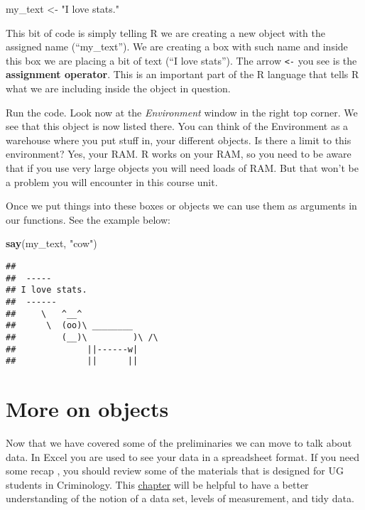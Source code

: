 \documentclass[
]{book}
\newenvironment{Shaded}{\begin{snugshade}}{\end{snugshade}}
\newcommand{\FunctionTok}[1]{\textcolor[rgb]{0.13,0.29,0.53}{\textbf{#1}}}
\newcommand{\NormalTok}[1]{#1}
\newcommand{\OtherTok}[1]{\textcolor[rgb]{0.56,0.35,0.01}{#1}}
\newcommand{\StringTok}[1]{\textcolor[rgb]{0.31,0.60,0.02}{#1}}
\begin{document}
\begin{Shaded}
\begin{Highlighting}[]
\NormalTok{my\_text }\OtherTok{\textless{}{-}} \StringTok{"I love stats."}
\end{Highlighting}
\end{Shaded}

This bit of code is simply telling R we are creating a new object with the assigned name (``my\_text''). We are creating a box with such name and inside this box we are placing a bit of text (``I love stats''). The arrow \texttt{\textless{}-} you see is the \textbf{assignment operator}. This is an important part of the R language that tells R what we are including inside the object in question.

Run the code. Look now at the \emph{Environment} window in the right top corner. We see that this object is now listed there. You can think of the Environment as a warehouse where you put stuff in, your different objects. Is there a limit to this environment? Yes, your RAM. R works on your RAM, so you need to be aware that if you use very large objects you will need loads of RAM. But that won't be a problem you will encounter in this course unit.

Once we put things into these boxes or objects we can use them as arguments in our functions. See the example below:

\begin{Shaded}
\begin{Highlighting}[]
\FunctionTok{say}\NormalTok{(my\_text, }\StringTok{"cow"}\NormalTok{)}
\end{Highlighting}
\end{Shaded}

\begin{verbatim}
## 
##  ----- 
## I love stats. 
##  ------ 
##     \   ^__^ 
##      \  (oo)\ ________ 
##         (__)\         )\ /\ 
##              ||------w|
##              ||      ||
\end{verbatim}

\section{More on objects}\label{more-on-objects}

Now that we have covered some of the preliminaries we can move to talk about data. In Excel you are used to see your data in a spreadsheet format. If you need some recap
, you should review some of the materials that is designed for UG students in Criminology. This \href{https://maczokni.github.io/MSCD_labs/week1.html\#data-variables-and-observations}{chapter} will be helpful to have a better understanding of the notion of a data set, levels of measurement, and tidy data.
\end{document}
